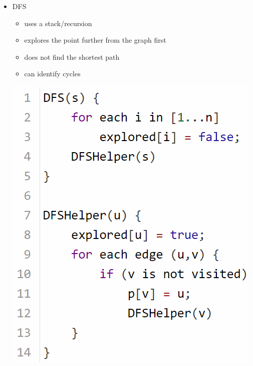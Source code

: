 \begin{itemize}
    \item DFS
    \begin{itemize}[leftmargin = 1em]
        \item uses a stack/recursion
        \item explores the point further from the graph first
        \item does not find the shortest path 
        \item can identify cycles
    \end{itemize}
    \includegraphics[scale = 0.6]{pictures/DFS code.png}
   
\end{itemize}
